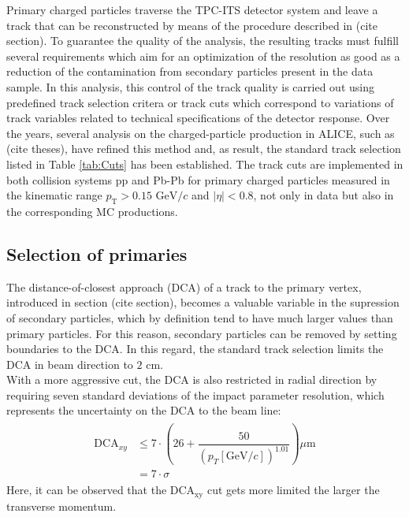 \documentclass[12pt,a4paper]{report}
\begin{document}
Primary charged particles traverse the TPC-ITS detector system and leave a track that can be reconstructed by means of the procedure described in (cite section). To guarantee the quality of the analysis, the resulting tracks must fulfill several requirements which aim for an optimization of the \pt resolution as good as a reduction of the contamination from secondary particles present in the data sample. In this analysis, this control of the track quality is carried out using predefined track selection critera or track cuts which correspond to variations of track variables related to technical specifications of the detector response. Over the years, several analysis on the charged-particle production in ALICE, such as (cite theses), have refined this method and, as result, the standard track selection listed in Table \ref{tab:Cuts} has been established. The track cuts are implemented in both collision systems pp and Pb-Pb for primary charged particles measured in the kinematic range $p_\text{T} > 0.15\text{ GeV}/c$ and $|\eta| < 0.8$, not only in data but also in the corresponding MC productions. 
\iffalse
\subsection{Selection of primaries}
\label{sec:SelOfPrim}
The distance-of-closest approach (DCA) of a track to the primary vertex, introduced in section (cite section), becomes a valuable variable in the supression of secondary particles, which by definition tend to have much larger values than primary particles. For this reason, secondary particles can be removed by setting boundaries to the DCA. In this regard, the standard track selection limits the DCA in beam direction to $2$ cm.\\
With a more aggressive cut, the DCA is also restricted in radial direction by requiring seven standard deviations of the impact parameter resolution, which represents the uncertainty on the DCA to the beam line: %
\begin{align}
\begin{split}
\text{DCA}_{xy} &\leq 7 \cdot \left(26 + \dfrac{50}{(p_{T}[\text{GeV}/c])^{1.01}}\right) \mu \text{m} \\
& = 7\cdot \sigma
\end{split}
\end{align}
Here, it can be observed that the DCA$_{\text{xy}}$ cut gets more limited the larger the transverse momentum. 
\end{document}
